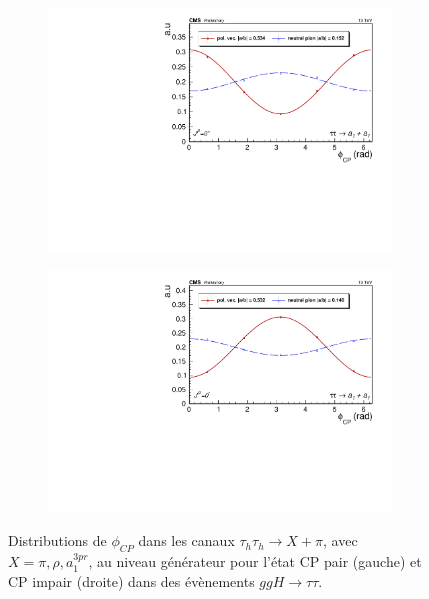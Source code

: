 \begin{figure}[]
    \begin{subfigure}[b]{0.5\linewidth}
    \centering
    \includegraphics[width=\linewidth]{Chapitre6/Images/A1A1/A1A1_even_gen.pdf} 
    \caption*{} 
    \vspace{0.5ex}
  \end{subfigure}%
  \begin{subfigure}[b]{0.5\linewidth}
    \centering
    \includegraphics[width=\linewidth]{Chapitre6/Images/A1A1/A1A1_odd_gen.pdf} 
    \caption*{} 
    \vspace{0.5ex}
  \end{subfigure} 
  \caption{Distributions de $\phi_{CP}$ dans les canaux $\tau_h\tau_h\rightarrow X+\pi$, avec $X=\pi,\rho,a^{3pr}_1$, au niveau générateur pour l'état CP pair (gauche) et CP impair (droite) dans des évènements $ggH\to\tau\tau$.}
  \label{CPgen}
\end{figure}

